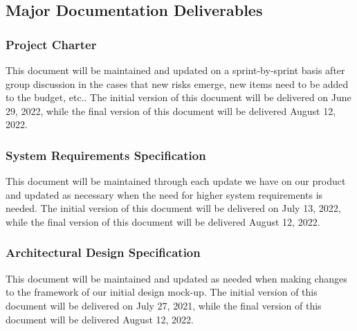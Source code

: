 
\subsection{Major Documentation Deliverables}

\subsubsection{Project Charter}
This document will be maintained and updated on a sprint-by-sprint basis after group discussion in the cases that new risks emerge, new items need to be added to the budget, etc.. The initial version of this document will be delivered on June 29, 2022, while the final version of this document will be delivered August 12, 2022.

\subsubsection{System Requirements Specification}
This document will be maintained through each update we have on our product and updated as necessary when the need for higher system requirements is needed. The initial version of this document will be delivered on July 13, 2022, while the final version of this document will be delivered August 12, 2022.

\subsubsection{Architectural Design Specification}
This document will be maintained and updated as needed when making changes to the framework of our initial design mock-up. The initial version of this document will be delivered on July 27, 2021, while the final version of this document will be delivered August 12, 2022.


